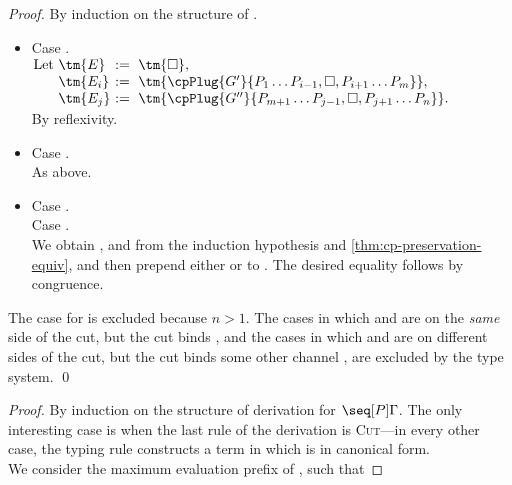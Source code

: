 \documentclass[UKenglish]{llncs}
\begin{document}
\begin{subappendices}
\begin{proof}
    By induction on the structure of .
    \begin{itemize}
    \item
      Case . 
      \\
      \(\arraycolsep=0pt\begin{array}[t]{lll}
        \text{Let}&\ \tm{E}  &\ :=\ \tm{\Box}, \\
                  &\ \tm{E_i}&\ :=\ \tm{\cpPlug{G'}{P_1\dots P_{i-1},\Box,P_{i+1}\dots P_m}}, \\
                  &\ \tm{E_j}&\ :=\ \tm{\cpPlug{G''}{P_{m+1}\dots P_{j-1},\Box,P_{j+1}\dots P_n}}.
      \end{array}\)
      \\[1ex]
      By reflexivity.
    \item
      Case .
      \\
      As above.
    \item
      Case . \\
      Case .
      \\
      We obtain ,  and  from the induction hypothesis and
      \cref{thm:cp-preservation-equiv}, and then prepend either
       or
       to .
      The desired equality follows by congruence.
    \end{itemize}
    The case for \tm{\Box} is excluded because $n > 1$.
    The cases in which  and  are on the \emph{same} side of the
    cut, but the cut binds , and the cases in which  and 
    are on different sides of the cut, but the cut binds some other channel
    , are excluded by the type system.
    \qed
  \end{proof}
  \thmcpprogress
  \begin{proof}
    By induction on the structure of derivation for $\seq[{ P }]{ \Gamma }$.
    The only interesting case is when the last rule of the derivation is
    \textsc{Cut}---in every other case, the typing rule constructs a term in
    which is in canonical form. 
    \\
    We consider the maximum evaluation prefix  of , such that

\end{proof}
\end{subappendices}
\end{document}
